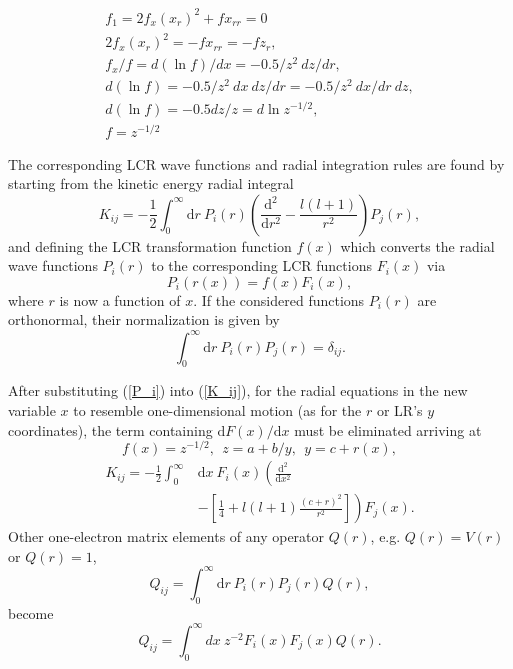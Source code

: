 \documentclass[aip
, pra
, showpacs
, aps
, twocolumn
, groupedaddress
, floatfix
]{revtex4}
\newcommand{\beq}{\begin{equation}}
\newcommand{\eeq}{\end{equation}}
\newcommand{\barr}{\begin{array}}
\newcommand{\earr}{\end{array}}
\newcommand{\dd}{\mbox{d}}
\begin{document}
\beq \barr{l}
f_1 = 2 f_x (x_r)^2 + f  x_{rr} = 0\\
2 f_x (x_r)^2 = - f  x_{rr}=-f z_r, \\
f_x /f =d(\ln f)/dx= -0.5 /z^2 \ dz/dr, \\
d(\ln f)= -0.5 /z^2 \ dx \  dz/dr = -0.5 /z^2 \ dx/dr \  dz, \\
d(\ln f)= -0.5 dz/z = d \ln z^{-1/2}, \\
f = z^{-1/2}
\earr \eeq

The corresponding LCR wave functions and radial integration rules are found by starting from the kinetic energy radial integral
\beq
K_{ij}=-\frac{1}{2} \int_0^{\infty} \dd r \
P_i(r) \left( \frac{\mbox{d}^2}{\mbox{d}r^2} - \frac{l(l+1)}{r^2} \right) P_j(r), \label{K_ij}
\eeq
and defining the LCR transformation function $f(x)$
which converts the radial wave functions $P_i(r)$ to the corresponding LCR functions $F_i(x)$ via
\beq
P_i \left( r(x) \right) = f(x) F_i(x), \label{P_i}
\eeq
where $r$ is now a function of $x$.
If the considered functions $P_i(r)$ are orthonormal, their normalization is given by
\beq
\int_0^{\infty} \dd r \
P_i(r) P_j(r) = \delta_{ij}. \label{P_ij}
\eeq


After substituting (\ref{P_i}) into (\ref{K_ij}), for the radial equations in the new variable $x$ to resemble one-dimensional motion (as for the $r$ or LR's $y$ coordinates), the term containing $\mbox{d}F(x)/\mbox{d}x$ must be eliminated arriving at
\beq
f(x) = z^{-1/2}, \ \ z=a+b/y, \ \ y=c+r(x), \label{f_x}
\eeq
\beq
\begin{array}{ll}
K_{ij}=-\frac{1}{2} \int_0^{\infty} & \mbox{d}x \ F_i(x)  \left( \frac{\mbox{d}^2}{\mbox{d}x^2} \right. \\
  & - \left. \left[ \frac{1}{4} + l(l+1) \frac{(c+r)^2}{r^2} \right] \right) F_j(x).
\end{array}
\label{K_ij_LCR}
\eeq
Other one-electron matrix elements of any operator $Q(r)$, e.g. $Q(r)=V(r)$ or $Q(r)=1$,
\beq
Q_{ij}= \int_0^{\infty} \dd r \ P_i(r) P_j(r) Q(r), \label{Q_ij}
\eeq
become
\beq
Q_{ij}= \int_0^{\infty} dx \  z^{-2} F_i(x) F_j(x) Q(r). \label{Q_ij_LCR}
\eeq
\end{document}
